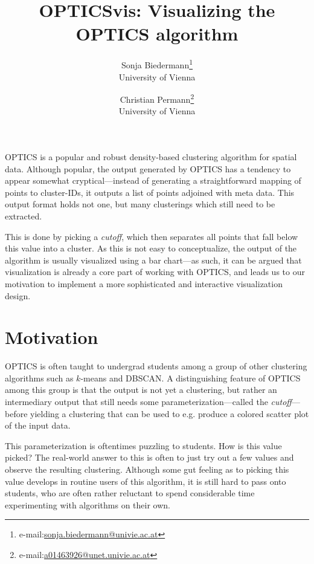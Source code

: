 \documentclass{vgtc} %
\title{OPTICSvis: Visualizing the OPTICS algorithm}
\author{Sonja Biedermann\thanks{e-mail:\href{mailto:sonja.biedermann@univie.ac.at}{sonja.biedermann@univie.ac.at}}\\ %
\scriptsize University of Vienna %
\and Christian Permann\thanks{e-mail:\href{mailto:a01463926@unet.univie.ac.at}{a01463926@unet.univie.ac.at}}\\ %
\scriptsize University of Vienna}
\begin{document}


\maketitle


OPTICS is a popular and robust density-based clustering algorithm for spatial
data. Although popular, the output generated by OPTICS has a tendency to appear
somewhat cryptical---instead of generating a straightforward mapping of points
to cluster-IDs, it outputs a list of points adjoined with meta data. This output
format holds not one, but many clusterings which still need to be extracted.

This is done by picking a \emph{cutoff}, which then separates all points that
fall below this value into a cluster. As this is not easy to conceptualize, the
output of the algorithm is usually visualized using a bar chart---as such, it
can be argued that visualization is already a core part of working with
OPTICS, and leads us to our motivation to implement a more sophisticated and
interactive visualization design.

\section{Motivation} %

OPTICS is often taught to undergrad students among a group of other clustering
algorithms such as $k$-means and DBSCAN. A distinguishing feature of OPTICS among
this group is that the output is not yet a clustering, but rather an
intermediary output that still needs some parameterization---called the
\emph{cutoff}---before yielding a clustering that can be used to e.g. produce
a colored scatter plot of the input data.

This parameterization is oftentimes puzzling to students. How is this value
picked? The real-world answer to this is often to just try out a few values and
observe the resulting clustering. Although some gut feeling as to picking this
value develops in routine users of this algorithm, it is still hard to pass
onto students, who are often rather reluctant to spend considerable time
experimenting with algorithms on their own.
\end{document}
